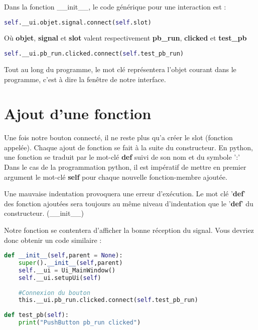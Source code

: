 \documentclass[12pt]{report}    %
\begin{document}
Dans la fonction \_\_init\_\_, le code générique pour une interaction est  : \newline
\begin{lstlisting}[language=python]
	 self.__ui.objet.signal.connect(self.slot)
\end{lstlisting}
Où \textbf{objet}, \textbf{signal} et \textbf{slot} valent respectivement \textbf{pb\_run}, \textbf{clicked} et \textbf{test\_pb}
\begin{lstlisting}[language=python]
	 self.__ui.pb_run.clicked.connect(self.test_pb_run)
\end{lstlisting}
Tout au long du programme, le mot clé  représentera l'objet courant dans le programme, c'est à dire la fenêtre de notre interface. \newline

\section{Ajout d'une fonction}

Une fois notre bouton connecté, il ne reste plus qu'a créer le slot (fonction appelée). \newline
Chaque ajout de fonction se fait à la suite du constructeur.
En python, une fonction se traduit par le mot-clé \textbf{def} suivi de son nom et du symbole ':' \newline
{\color{red}Dans le cas de la programmation python, il est impératif de mettre en premier argument le mot-clé \textbf{self} pour chaque nouvelle fonction-membre ajoutée.} \newline

Une mauvaise indentation provoquera une erreur d'exécution. 
Le mot clé '\textbf{def}' des fonction ajoutées sera toujours au même niveau d'indentation que le '\textbf{def}' du constructeur. (\_\_init\_\_)\newline

Notre fonction  se contentera d'afficher la bonne réception du signal. Vous devriez donc obtenir un code similaire : \newline

\begin{lstlisting}[language=Python]
def __init__(self,parent = None):
    super().__init__(self,parent)
    self.__ui = Ui_MainWindow()
    self.__ui.setupUi(self)
    
    #Connexion du bouton
    this.__ui.pb_run.clicked.connect(self.test_pb_run)
        
def test_pb(self):
    print("PushButton pb_run clicked")
        
\end{lstlisting}
\end{document}
